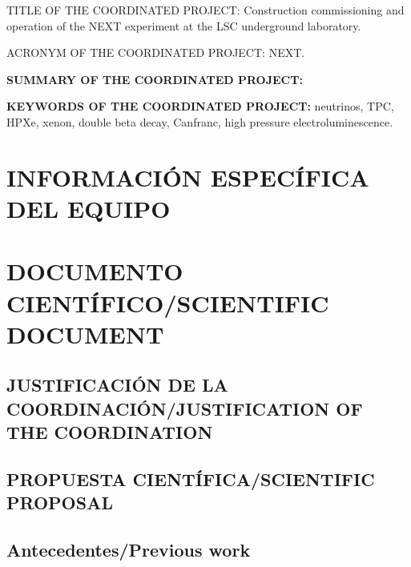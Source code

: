 \documentclass[a4paper,11pt,oneside]{article}
\begin{document}
 \vspace{0.6cm}
{\sc TITLE OF THE COORDINATED PROJECT:} Construction commissioning and operation of the NEXT experiment at the LSC underground laboratory. 
\vspace{0.3cm}

{\sc ACRONYM OF THE COORDINATED PROJECT:} NEXT.
\vspace{0.3cm}

{\bf SUMMARY OF THE COORDINATED PROJECT:} 
\vspace{0.3cm}

%

 \vspace{0.3cm}

{\bf KEYWORDS OF THE COORDINATED PROJECT:} neutrinos, TPC, HPXe, xenon, double beta decay, Canfranc, high pressure electroluminescence. 

\section{INFORMACIÓN ESPECÍFICA DEL EQUIPO}





\section{\bf DOCUMENTO CIENTÍFICO/SCIENTIFIC DOCUMENT}

\subsection{\sc JUSTIFICACIÓN DE LA COORDINACIÓN/JUSTIFICATION OF THE COORDINATION}
\vspace{0.3cm}

%

\subsection{\bf PROPUESTA CIENTÍFICA/SCIENTIFIC PROPOSAL}

%

\subsection*{\sc Antecedentes/Previous work}

%
\end{document}
